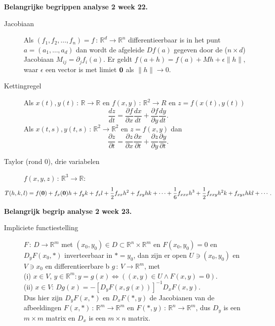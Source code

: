 
{\bf Belangrijke begrippen analyse 2 week 22.}
\vskip 8pt
\begin{description}
\item[Jacobiaan] Als $(f_1,f_2,\dots,f_n)=f\,:\,\mathbb R^d\to \mathbb R^n$ differentieerbaar is
in het punt $a=(a_1,\dots,a_d)$ dan wordt de afgeleide $Df(a)$ gegeven
door de ($n\times d$) Jacobiaan $M_{ij}=\partial_jf_i(a)$. Er geldt $f(a+h)=f(a)+Mh+\epsilon\|h\|$,
waar $\epsilon$ een vector is met limiet $\bf 0$ als $\|h\|\to 0$.
\item[Kettingregel] Als $x(t),y(t)\,:\,\mathbb R\to\mathbb R$ en $f(x,y)\,:\,\mathbb R^2\to R$
en $z=f(x(t),y(t))$ 
\[
\frac{dz}{dt}=\frac{\partial f}{\partial x}\frac{dx}{dt}+\frac{\partial f}{\partial y}\frac{dy}{dt}.
\]
Als $x(t,s),y(t,s)\,:\,\mathbb R^2\to\mathbb R^2$ en $z=f(x,y)$ dan
\[
\frac{\partial z}{\partial t}=\frac{\partial z}{\partial x}\frac{\partial x}{\partial t}
+\frac{\partial z}{\partial y}\frac{\partial y}{\partial t}.
\]
\item[Taylor (rond 0), drie variabelen] $f(x,y,z)\,:\,\mathbb R^3\to \mathbb R$:
\[
\!\!\!\!\!\!\!\!\!\!\!\!\!\!\!\!\!\!\!\! T(h,k,l)=f({\bf 0})+ f_x({\bf 0})h + f_y k+ f_z l+
\frac12 f_{xx}h^2+ f_{xy}hk +\cdots+\frac16 f_{xxx}h^3+\frac12 f_{xxy}h^2k+ f_{xyz}hkl +\cdots. 
\] 
\end{description}
\vskip 8pt
{\bf Belangrijk begrip analyse 2 week 23.}
\begin{description}
\item[Impliciete functiestelling] $F\,:\,D\to \mathbb R^m$ met
$(x_0,y_0)\in D\subset \mathbb R^n\times \mathbb R^m$ en $F(x_0,y_0)=0$
en $D_yF(x_0,*)$ inverteerbaar in $*=y_0$, dan zijn er open $U\ni (x_0,y_0)$ en
$V\ni x_0$ en differentieerbare b $g\,:\,V\to\mathbb R^m$, met\\
(i) $x\in V$, $y\in\mathbb R^m: y=g(x) \Leftrightarrow ((x,y)\in U\wedge F(x,y)=0)$.\\
(ii) $x\in V$: $Dg(x)=-[D_yF(x,g(x))]^{-1}D_xF(x,y)$.\\[6pt]  
Dus hier zijn $D_yF(x,*)$ en $D_xF(*,y)$ de Jacobianen van de afbeeldingen
$F(x,*)\,:\,\mathbb R^m\to\mathbb R^m$ en $F(*,y)\,:\,\mathbb R^n\to \mathbb R^m$,
dus $D_y$ is een $m\times m$ matrix en $D_x$ is een $m\times n$ matrix. 

\end{description}